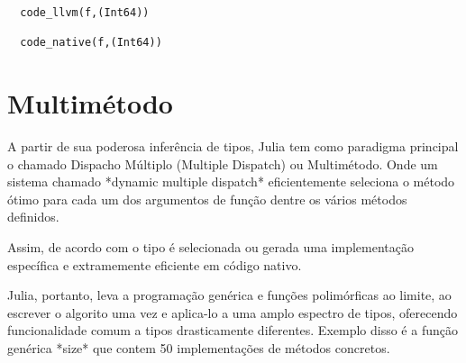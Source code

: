 \begin{lstlisting}
  code_llvm(f,(Int64))

  code_native(f,(Int64))
\end{lstlisting}

\section{Multimétodo}
A partir de sua poderosa inferência de tipos, Julia tem como paradigma principal o chamado Dispacho Múltiplo (Multiple Dispatch) ou Multimétodo. Onde um sistema chamado *dynamic multiple dispatch* eficientemente seleciona o método ótimo para cada um dos argumentos de função dentre os vários métodos definidos. %

Assim, de acordo com o tipo é selecionada ou gerada uma implementação específica e extramemente eficiente em código nativo. %

Julia, portanto, leva a programação genérica e funções polimórficas ao limite, ao escrever o algorito uma vez e aplica-lo a uma amplo espectro de tipos, oferecendo funcionalidade comum a tipos drasticamente diferentes. Exemplo disso é a função genérica *size* que contem 50 implementações de métodos concretos. %

